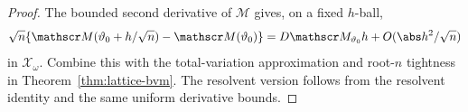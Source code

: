 \begin{proof}
The bounded second derivative of \(\mathscr M\) gives, on a fixed \(h\)-ball,
\[
 \sqrt n\{\mathscr M(\vartheta_0+h/\sqrt n)-
 \mathscr M(\vartheta_0)\}
 =D\mathscr M_{\vartheta_0}h+O(\abs h^2/\sqrt n)
\]
in \(\mathcal X_\omega\).  Combine this with the total-variation
approximation and root-\(n\) tightness in
Theorem~\ref{thm:lattice-bvm}.  The resolvent version follows from the
resolvent identity and the same uniform derivative bounds.
\end{proof}

